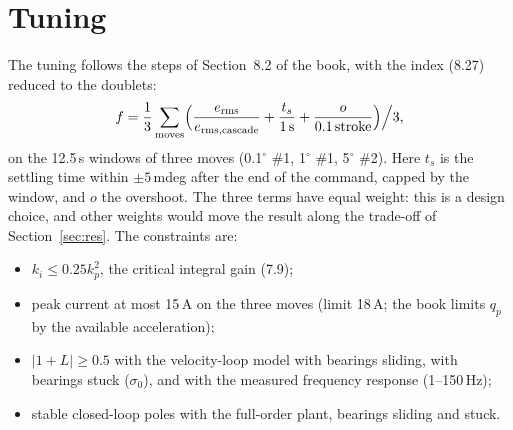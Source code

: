 \documentclass[10pt,a4paper]{article}
\numberwithin{equation}{section}
\begin{document}
\section{Tuning}\label{sec:tuning}
The tuning follows the steps of Section~8.2 of the book, with the index (8.27) reduced to the doublets:
\begin{equation}
f=\frac13\sum_{\text{moves}}\Bigl(\frac{e_\mathrm{rms}}{e_\mathrm{rms,cascade}}+\frac{t_s}{1\,\mathrm{s}}+\frac{o}{0.1\,\mathrm{stroke}}\Bigr)\Big/3 ,
\end{equation}
on the 12.5\,s windows of three moves (0.1$^\circ$ \#1, 1$^\circ$ \#1, 5$^\circ$ \#2). Here $t_s$ is the settling time within $\pm5$\,mdeg after the end of the command, capped by the window, and $o$ the overshoot. The three terms have equal weight: this is a design choice, and other weights would move the result along the trade-off of Section~\ref{sec:res}. The constraints are:
\begin{itemize}
\item $k_i\leq0.25k_p^2$, the critical integral gain (7.9);
\item peak current at most 15\,A on the three moves (limit 18\,A; the book limits $q_p$ by the available acceleration);
\item $|1+L|\geq0.5$ with the velocity-loop model with bearings sliding, with bearings stuck ($\sigma_0$), and with the measured frequency response (1--150\,Hz);
\item stable closed-loop poles with the full-order plant, bearings sliding and stuck.
\end{itemize}
\end{document}
